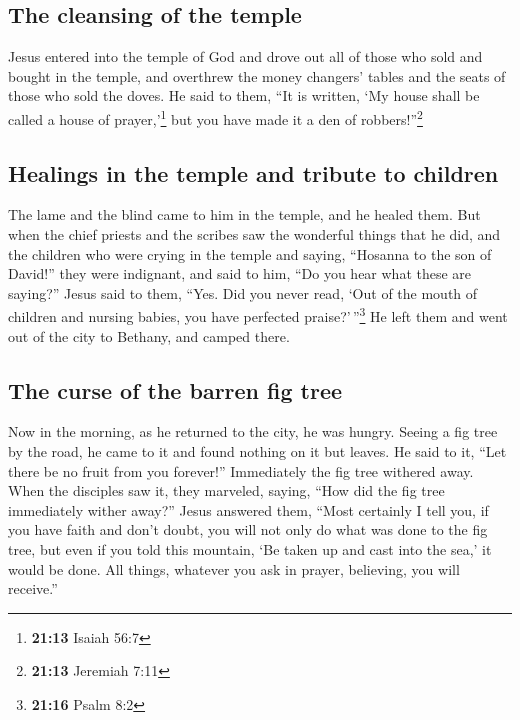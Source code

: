 \hypertarget{the-cleansing-of-the-temple}{%
\subsection{The cleansing of the
temple}\label{the-cleansing-of-the-temple}}

 Jesus entered into the temple of God and drove out all
of those who sold and bought in the temple, and overthrew the money
changers' tables and the seats of those who sold the doves.
 He said to them, ``It is written, `My house shall be
called a house of prayer,'\footnote{\textbf{21:13} Isaiah 56:7} but you
have made it a den of robbers!''\footnote{\textbf{21:13} Jeremiah 7:11}

\hypertarget{healings-in-the-temple-and-tribute-to-children}{%
\subsection{Healings in the temple and tribute to
children}\label{healings-in-the-temple-and-tribute-to-children}}

 The lame and the blind came to him in the temple, and he
healed them.  But when the chief priests and the scribes
saw the wonderful things that he did, and the children who were crying
in the temple and saying, ``Hosanna to the son of David!'' they were
indignant,  and said to him, ``Do you hear what these are
saying?'' Jesus said to them, ``Yes. Did you never read, `Out of the
mouth of children and nursing babies, you have perfected
praise?'\,''\footnote{\textbf{21:16} Psalm 8:2}  He left
them and went out of the city to Bethany, and camped there.

\hypertarget{the-curse-of-the-barren-fig-tree}{%
\subsection{The curse of the barren fig
tree}\label{the-curse-of-the-barren-fig-tree}}

 Now in the morning, as he returned to the city, he was
hungry.  Seeing a fig tree by the road, he came to it and
found nothing on it but leaves. He said to it, ``Let there be no fruit
from you forever!'' Immediately the fig tree withered away.
 When the disciples saw it, they marveled, saying, ``How
did the fig tree immediately wither away?''  Jesus
answered them, ``Most certainly I tell you, if you have faith and don't
doubt, you will not only do what was done to the fig tree, but even if
you told this mountain, `Be taken up and cast into the sea,' it would be
done.  All things, whatever you ask in prayer, believing,
you will receive.''

